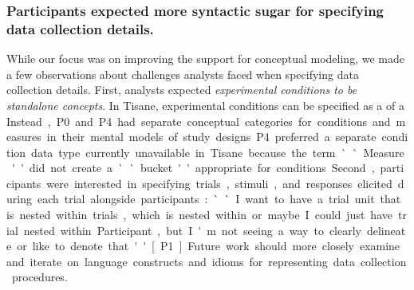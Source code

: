 \subsubsection{Participants expected more syntactic sugar for specifying data collection details.}
While our focus was on improving the support for conceptual modeling, we made a
few observations about challenges analysts faced when specifying data collection
details. First, analysts expected \textit{experimental conditions to be
standalone concepts}. In Tisane, experimental conditions can be specified as a
\measure of a \unit. Instead, P0 and P4 had separate conceptual categories for
conditions and measures in their mental models of study designs. P4 preferred a
separate condition data type currently unavailable in Tisane because the term
``Measure'' did not create a ``bucket'' appropriate for conditions. Second,
participants were interested in specifying trials, stimuli, and responses
elicited during each trial alongside participants: ``I want to have a trial
unit that is nested within trials, which is nested within or maybe I could just
have trial nested within Participant, but I'm not seeing a way to clearly
delineate or like to denote that'' [P1]. Future work should more closely examine
and iterate on language constructs and idioms for representing data collection
procedures. 



